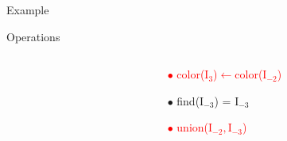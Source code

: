 \begin{frame}{Example}
\begin{overlayarea}{\textwidth}{\textheight}
{\begin{block}{Operations}
\begin{columns}[T]
\begin{column}{.48\textwidth}
      \end{column}
      \begin{column}{.48\textwidth}
        \begin{itemize}
          \item[\textcolor{red}{$\bullet$}]\textcolor{red}{color($\mathrm{I_{3}}$)$\leftarrow$color($\mathrm{I_{-2}}$)}
          \item[$\bullet$]find($\mathrm{I_{-3}}$) = $\mathrm{I_{-3}}$
          \item[\textcolor{red}{$\bullet$}]\textcolor{red}{union($\mathrm{I_{-2}},\mathrm{I_{-3}}$)}
        \end{itemize}
      \end{column}
      \end{columns}  
    \end{block}
  }
  
  
\end{overlayarea}
\end{frame}
